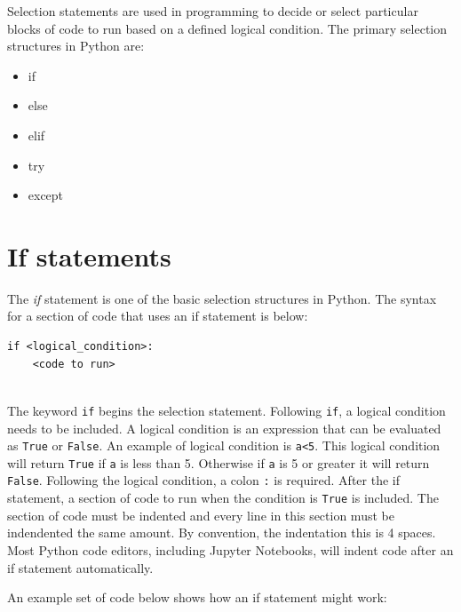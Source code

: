 \documentclass{book}
\providecommand{\tightlist}{%
      \setlength{\itemsep}{0pt}\setlength{\parskip}{0pt}}
\begin{document}
    
        Selection statements are used in programming to decide or select
particular blocks of code to run based on a defined logical condition.
The primary selection structures in Python are:

\begin{itemize}
\tightlist
\item
  if
\item
  else
\item
  elif
\item
  try
\item
  except
\end{itemize}
    




    
        \section{If statements}\label{if-statements}
    




    
        The \emph{if} statement is one of the basic selection structures in
Python. The syntax for a section of code that uses an if statement is
below:

\begin{lstlisting}
if <logical_condition>:
    <code to run>
    
\end{lstlisting}

The keyword \lstinline!if! begins the selection statement. Following
\lstinline!if!, a logical condition needs to be included. A logical
condition is an expression that can be evaluated as \lstinline!True! or
\lstinline!False!. An example of logical condition is \lstinline!a<5!.
This logical condition will return \lstinline!True! if \lstinline!a! is
less than 5. Otherwise if \lstinline!a! is 5 or greater it will return
\lstinline!False!. Following the logical condition, a colon
\lstinline!:! is required. After the if statement, a section of code to
run when the condition is \lstinline!True! is included. The section of
code must be indented and every line in this section must be indendented
the same amount. By convention, the indentation this is 4 spaces. Most
Python code editors, including Jupyter Notebooks, will indent code after
an if statement automatically.

An example set of code below shows how an if statement might work:
    
\end{document}

